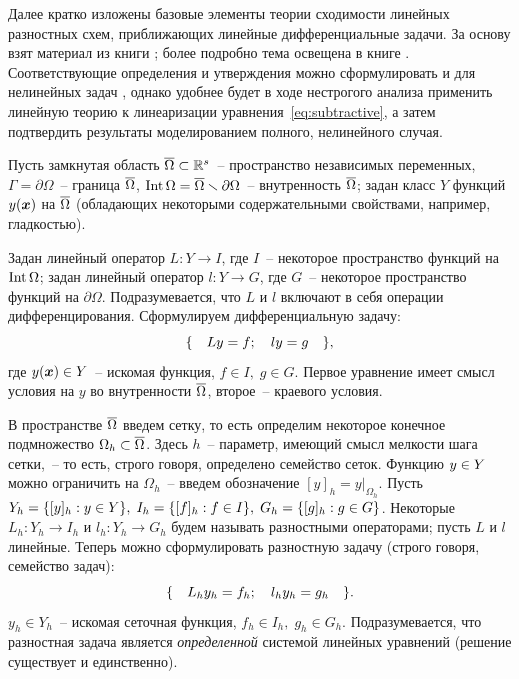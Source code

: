 Далее кратко изложены базовые элементы теории сходимости линейных разностных схем, приближающих линейные дифференциальные задачи. За основу взят материал из книги \cite[глава 10]{bahvalov_computational_methods}; более подробно тема освещена в книге \cite[глава IX]{kalitkin_computational_methods}. Соответствующие определения и утверждения можно сформулировать и для нелинейных задач \cite{kalitkin_computational_methods}, однако удобнее будет в ходе нестрогого анализа применить линейную теорию к линеаризации уравнения~\eqref{eq:subtractive}, а затем подтвердить результаты моделированием полного, нелинейного случая.

Пусть замкнутая область ${\overline{\Omega}} \subset {\mathbb{R}}^s$~-- пространство независимых переменных, $\Gamma = \partial \Omega$~-- граница ${\overline{\Omega}}$, $\operatorname{{Int}} \Omega = {\overline{\Omega}} \smallsetminus \partial \Omega$~-- внутренность ${\overline{\Omega}}$; задан класс $Y$ функций $y({\boldsymbol{x}})$ на ${\overline{\Omega}}$ (обладающих некоторыми содержательными свойствами, например, гладкостью).

Задан линейный оператор $L: Y \to I$, где $I$~-- некоторое пространство функций на $\operatorname{{Int}} \Omega$; задан линейный оператор $l: Y \to G$, где $G$~-- некоторое пространство функций на $\partial \Omega$. Подразумевается, что $L$ и $l$ включают в себя операции дифференцирования. Сформулируем дифференциальную задачу:
\begin{equation}
	\{ \quad Ly = f; \quad ly = g \quad \} {\text{,}}
	\label{eq:formal_differential}
\end{equation}
где $y({\boldsymbol{x}}) \in Y$~-- искомая функция, $f \in I, \; g \in G$. Первое уравнение имеет смысл условия на $y$ во внутренности ${\overline{\Omega}}$, второе~-- краевого условия.

В пространстве ${\overline{\Omega}}$ введем сетку, то есть определим некоторое конечное подмножество $\Omega_h \subset {\overline{\Omega}}$. Здесь $h$~-- параметр, имеющий смысл мелкости шага сетки,~-- то есть, строго говоря, определено семейство сеток. Функцию $y \hm \in Y$ можно ограничить на $\Omega_h$~-- введем обозначение $[y]_h = y|_{\Omega_h}$. Пусть $Y_h \hm = \{[y]_h: y \in Y\}, \; I_h = \{[f]_h: f \in I\}, \; G_h = \{[g]_h: g \in G\}$. Некоторые $L_h: Y_h \to I_h$ и $l_h: Y_h \to G_h$ будем называть разностными операторами; пусть $L$ и $l$ линейные. Теперь можно сформулировать разностную задачу (строго говоря, семейство задач):
\begin{equation}
	\{ \quad L_h y_h = f_h; \quad l_h y_h = g_h \quad \} {\text{.}}
	\label{eq:formal_subtractive}
\end{equation}
$y_h \in Y_h$~-- искомая сеточная функция, $f_h \in I_h, \; g_h \in G_h$. Подразумевается, что разностная задача является \emph{определенной} системой линейных уравнений (решение существует и единственно).


